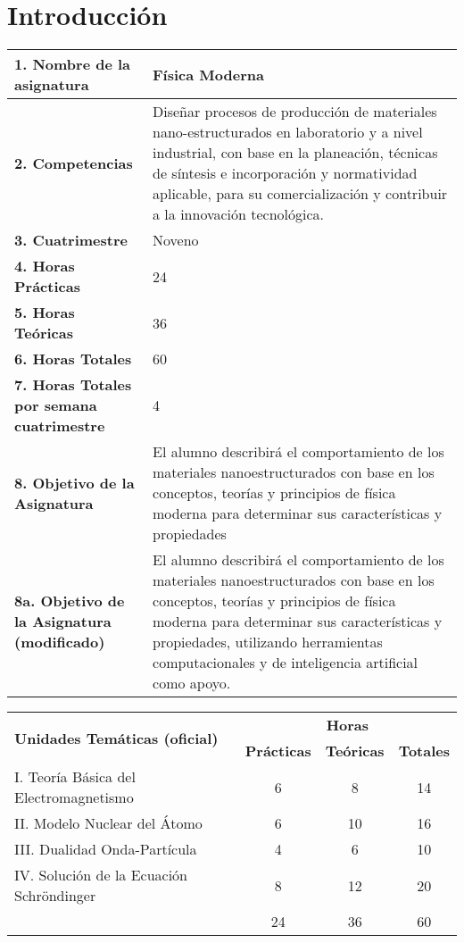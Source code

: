 \chapter{Introducción}

\begin{tabular}{|p{6cm}|p{10cm}|}
	\hline 
	\textbf{1. Nombre de la asignatura }& Física Moderna \\
	\hline 
	\textbf{2. Competencias }& Diseñar procesos de producción de materiales nano-estructurados en laboratorio y a nivel industrial, con base en la planeación, técnicas de síntesis e incorporación y normatividad aplicable, para su comercialización y contribuir a la innovación tecnológica.
	
 \\
       \hline 
       \textbf{3. Cuatrimestre} & Noveno \\
       \hline 
       \textbf{4. Horas Prácticas} & 24 \\
       \hline
        \textbf{5. Horas Teóricas} & 36 \\
        \hline
       \textbf{6. Horas Totales} & 60 \\
        \hline
        \textbf{7. Horas Totales por semana cuatrimestre} & 4 \\
        \hline
        \textbf{8. Objetivo de la Asignatura} & El alumno describirá el comportamiento de los materiales nanoestructurados con base en los conceptos, teorías y principios de física moderna para determinar sus características y propiedades\\
        \hline
        \textbf{8a. Objetivo de la Asignatura (modificado)} & El alumno describirá el comportamiento de los materiales nanoestructurados con base en los conceptos, teorías y principios de física moderna para determinar sus características y propiedades, utilizando herramientas computacionales y de inteligencia artificial como apoyo.\\
        \hline
	\end{tabular}
	
\begin{tabular}{|p{9.5cm}|c|c|c|}
\hline
\multirow{2}{*}{\textbf{Unidades Temáticas (oficial)}} & \multicolumn{3}{c}{\textbf{Horas}} \\


  & \textbf{Prácticas} & \textbf{Teóricas} & \textbf{Totales} \\
  \hline
I. Teoría Básica del Electromagnetismo 
 & 6 & 8 & 14\\
\hline
II. Modelo Nuclear del Átomo & 6 & 10 & 16\\
\hline
III. Dualidad Onda-Partícula & 4 & 6 & 10 \\
\hline
IV. Solución de la Ecuación Schröndinger & 8 & 12 & 20 \\
\hline
 & 24 & 36 & 60 \\
\hline

\end{tabular}

